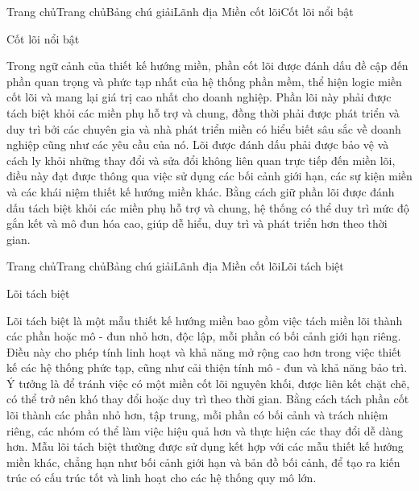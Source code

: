 

Trang chủTrang chủBảng chú giảiLãnh địa Miền cốt lõiCốt lõi nổi bật

Cốt lõi nổi bật

Trong ngữ cảnh của thiết kế hướng miền, phần cốt lõi được đánh dấu đề cập đến phần quan trọng và phức tạp nhất của hệ thống phần mềm, thể hiện logic miền cốt lõi và mang lại giá trị cao nhất cho doanh nghiệp. Phần lõi này phải được tách biệt khỏi các miền phụ hỗ trợ và chung, đồng thời phải được phát triển và duy trì bởi các chuyên gia và nhà phát triển miền có hiểu biết sâu sắc về doanh nghiệp cũng như các yêu cầu của nó. Lõi được đánh dấu phải được bảo vệ và cách ly khỏi những thay đổi và sửa đổi không liên quan trực tiếp đến miền lõi, điều này đạt được thông qua việc sử dụng các bối cảnh giới hạn, các sự kiện miền và các khái niệm thiết kế hướng miền khác. Bằng cách giữ phần lõi được đánh dấu tách biệt khỏi các miền phụ hỗ trợ và chung, hệ thống có thể duy trì mức độ gắn kết và mô đun hóa cao, giúp dễ hiểu, duy trì và phát triển hơn theo thời gian.






Trang chủTrang chủBảng chú giảiLãnh địa Miền cốt lõiLõi tách biệt

Lõi tách biệt

Lõi tách biệt là một mẫu thiết kế hướng miền bao gồm việc tách miền lõi thành các phần hoặc mô - đun nhỏ hơn, độc lập, mỗi phần có bối cảnh giới hạn riêng. Điều này cho phép tính linh hoạt và khả năng mở rộng cao hơn trong việc thiết kế các hệ thống phức tạp, cũng như cải thiện tính mô - đun và khả năng bảo trì. Ý tưởng là để tránh việc có một miền cốt lõi nguyên khối, được liên kết chặt chẽ, có thể trở nên khó thay đổi hoặc duy trì theo thời gian. Bằng cách tách phần cốt lõi thành các phần nhỏ hơn, tập trung, mỗi phần có bối cảnh và trách nhiệm riêng, các nhóm có thể làm việc hiệu quả hơn và thực hiện các thay đổi dễ dàng hơn. Mẫu lõi tách biệt thường được sử dụng kết hợp với các mẫu thiết kế hướng miền khác, chẳng hạn như bối cảnh giới hạn và bản đồ bối cảnh, để tạo ra kiến trúc có cấu trúc tốt và linh hoạt cho các hệ thống quy mô lớn.

